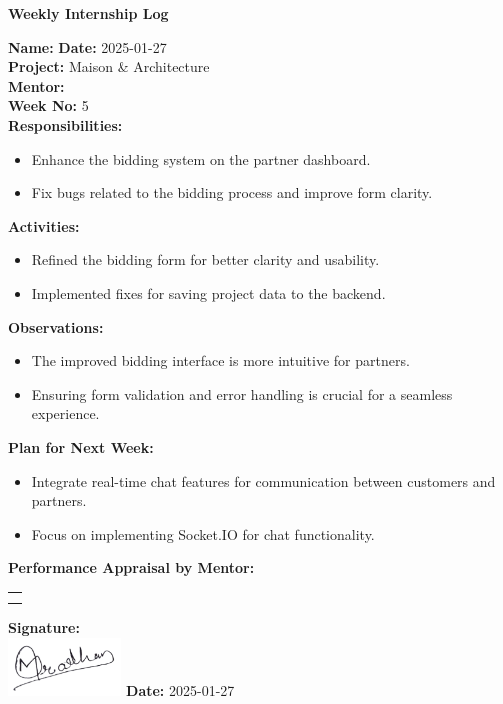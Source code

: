 \begin{center}
    \bfseries Weekly Internship Log
\end{center}

\noindent
\textbf{Name:}  \hfill \textbf{Date:} 2025-01-27 \\
\textbf{Project:} Maison \& Architecture \hfill \\
\textbf{Mentor:}  \\
\textbf{Week No:} 5 \\

\noindent
\textbf{Responsibilities:}
\begin{itemize}
    \item Enhance the bidding system on the partner dashboard.
    \item Fix bugs related to the bidding process and improve form clarity.
\end{itemize}

\noindent
\textbf{Activities:}
\begin{itemize}
    \item Refined the bidding form for better clarity and usability.
    \item Implemented fixes for saving project data to the backend.
\end{itemize}

\noindent
\textbf{Observations:}
\begin{itemize}
    \item The improved bidding interface is more intuitive for partners.
    \item Ensuring form validation and error handling is crucial for a seamless experience.
\end{itemize}

\noindent
\textbf{Plan for Next Week:}
\begin{itemize}
    \item Integrate real-time chat features for communication between customers and partners.
    \item Focus on implementing Socket.IO for chat functionality.
\end{itemize}

\noindent
\textbf{Performance Appraisal by Mentor:} \\
\begin{table}[h]
    \centering
    \noindent
    \begin{tabularx}{\textwidth} { 
        | >{\centering\arraybackslash}X| }

        \hline
        \\ \\
        \hline
    \end{tabularx}
\end{table}

\vfill
\noindent
\textbf{Signature:} \\
\includegraphics[width=3cm]{assets/nirajpradhan-sign.png} \hfill \textbf{Date:} 2025-01-27

